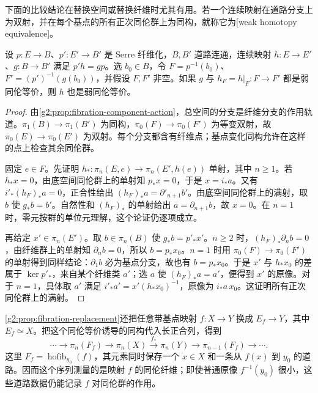 下面的比较结论在替换空间或替换纤维时尤其有用。若一个连续映射在道路分支上为双射，并在每个基点的所有正次同伦群上为同构，就称它为[weak homotopy equivalence]。

\begin{proposition}
	\label{g2:prop:fibration-comparison}
	设 \(p:E\to B\)、\(p':E'\to B'\) 是 Serre 纤维化，\(B,B'\) 道路连通，连续映射 \(h:E\to E'\)、\(g:B\to B'\) 满足 \(p'h=gp\)。选 \(b_0\in B\)，令 \(F=p^{-1}(b_0)\)、\(F'=(p')^{-1}(g(b_0))\)，并假设 \(F,F'\) 非空。如果 \(g\) 与 \(h_F=h|_F:F\to F'\) 都是弱同伦等价，则 \(h\) 也是弱同伦等价。
\end{proposition}

\begin{proof}
	由\cref{g2:prop:fibration-component-action}，总空间的分支是纤维分支的作用轨道。\(\pi_1(B)\to\pi_1(B')\) 为同构，\(\pi_0(F)\to\pi_0(F')\) 为等变双射，故 \(\pi_0(E)\to\pi_0(E')\) 为双射。每个分支都含有纤维点；基点变化同构允许在这样的点上检查其余同伦群。

	固定 \(e\in F\)。先证明 \(h_*:\pi_n(E,e)\to\pi_n(E',h(e))\) 单射，其中 \(n\ge1\)。若 \(h_*x=0\)，由底空间同伦群上的单射知 \(p_*x=0\)，于是 \(x=i_*a\)。又有 \(i'_*(h_F)_*a=0\)，正合性给出 \((h_F)_*a=\partial'_{n+1}b'\)。由底空间同伦群上的满射，取 \(b\) 使 \(g_*b=b'\)。自然性和 \((h_F)_*\) 的单射给出 \(a=\partial_{n+1}b\)，故 \(x=0\)。在 \(n=1\) 时，零元按群的单位元理解，这个论证仍逐项成立。

	再给定 \(x'\in\pi_n(E')\)。取 \(b\in\pi_n(B)\) 使 \(g_*b=p'_*x'\)。\(n\ge2\) 时，\((h_F)_*\partial_n b=0\)，由纤维群上的单射知 \(\partial_n b=0\)，所以 \(b=p_*x_0\)。\(n=1\) 时用 \(\pi_0(F)\to\pi_0(F')\) 的单射得到同样结论：\(\partial_1b\) 必为基点分支，故也有 \(b=p_*x_0\)。于是 \(x'\) 与 \(h_*x_0\) 的差属于 \(\ker p'_*\)，来自某个纤维类 \(a'\)；选 \(a\) 使 \((h_F)_*a=a'\)，便得到 \(x'\) 的原像。对于 \(n=1\)，具体取 \(a'\) 满足 \(i'_*a'=x'(h_*x_0)^{-1}\)，原像为 \(i_*a\,x_0\)。这证明所有正次同伦群上的满射。
\end{proof}

\cref{g2:prop:fibration-replacement}还把任意带基点映射 \(f:X\to Y\) 换成 \(E_f\to Y\)，其中 \(E_f\simeq X\)。把这个同伦等价诱导的同构代入长正合列，得到
\[
	\cdots\longrightarrow\pi_n(F_f)\longrightarrow\pi_n(X)
	\xrightarrow{f_*}\pi_n(Y)\longrightarrow\pi_{n-1}(F_f)\longrightarrow\cdots.
\]
这里 \(F_f=\operatorname{hofib}_{y_0}(f)\)，其元素同时保存一个 \(x\in X\) 和一条从 \(f(x)\) 到 \(y_0\) 的道路。因而这个序列测量的是映射 \(f\) 的同伦纤维；即使普通原像 \(f^{-1}(y_0)\) 很小，这些道路数据仍能记录 \(f\) 对同伦群的作用。
